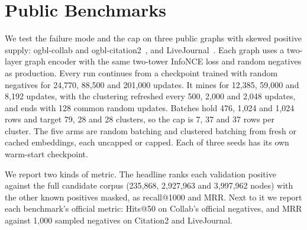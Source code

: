 \section{Public Benchmarks}
\label{sec:public}

 We test the failure mode and the cap on three public graphs with skewed positive supply: ogbl-collab and
ogbl-citation2~\cite{hu2020ogb}, and LiveJournal~\cite{yang2012defining}. Each graph uses a two-layer graph encoder
with the same two-tower InfoNCE loss and random negatives as production. Every run continues from a checkpoint trained
with random negatives for 24{,}770, 88{,}500 and 201{,}000 updates. It mines for 12{,}385, 59{,}000 and 8{,}192 updates,
with the clustering refreshed every 500, 2{,}000 and 2{,}048 updates, and ends with 128 common random updates. Batches
hold 476, 1{,}024 and 1{,}024 rows and target 79, 28 and 28 clusters, so the cap is 7, 37 and 37 rows per cluster. The
five arms are random batching and clustered batching from fresh or cached embeddings, each uncapped or capped. Each of
three seeds has its own warm-start checkpoint.

We report two kinds of metric. The headline ranks each validation positive against the full candidate corpus
(235{,}868, 2{,}927{,}963 and 3{,}997{,}962 nodes) with the other known positives masked, as recall@1000 and MRR. Next
to it we report each benchmark's official metric: Hits@50 on Collab's official negatives, and MRR against 1{,}000
sampled negatives on Citation2 and LiveJournal.

